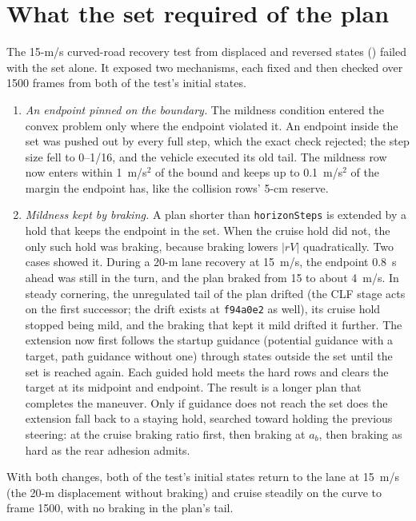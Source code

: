 \documentclass[11pt]{article}
\begin{document}
\section{What the set required of the plan}
The 15-m/s curved-road recovery test from displaced and reversed states
() failed with the set alone. It exposed two
mechanisms, each fixed and then checked over 1500 frames from both of the
test's initial states.
\begin{enumerate}
\item \emph{An endpoint pinned on the boundary.} The mildness condition
  entered the convex problem only where the endpoint violated it. An
  endpoint inside the set was pushed out by every full step, which the
  exact check rejected; the step size fell to 0--1/16, and the vehicle
  executed its old tail. The mildness row now enters within 1~m/s$^2$ of
  the bound and keeps up to 0.1~m/s$^2$ of the margin the endpoint has, like
  the collision rows' 5-cm reserve.
\item \emph{Mildness kept by braking.} A plan shorter than
  \texttt{horizonSteps} is extended by a hold that keeps the endpoint in the
  set. When the cruise hold did not, the only such hold was braking,
  because braking lowers $|rV|$ quadratically. Two cases showed it. During a
  20-m lane recovery at 15~m/s, the endpoint 0.8~s ahead was still in the
  turn, and the plan braked from 15 to about 4~m/s. In steady cornering,
  the unregulated tail of the plan drifted (the CLF stage acts on the first
  successor; the drift exists at \texttt{f94a0e2} as well), its cruise hold
  stopped being mild, and the braking that kept it mild drifted it further.
  The extension now first follows the startup guidance (potential guidance
  with a target, path guidance without one) through states outside the
  set until the set is reached again. Each guided hold meets the hard rows
  and clears the target at its midpoint and endpoint. The result is a longer
  plan that completes the maneuver. Only if guidance does not reach the set
  does the extension fall back to a staying hold, searched toward holding
  the previous steering: at the cruise braking ratio first, then braking at
  $a_b$, then braking as hard as the rear adhesion admits.
\end{enumerate}
With both changes, both of the test's initial states return to the lane at
15~m/s (the 20-m displacement without braking) and cruise steadily on the
curve to frame 1500, with no braking in the plan's tail.
\end{document}
